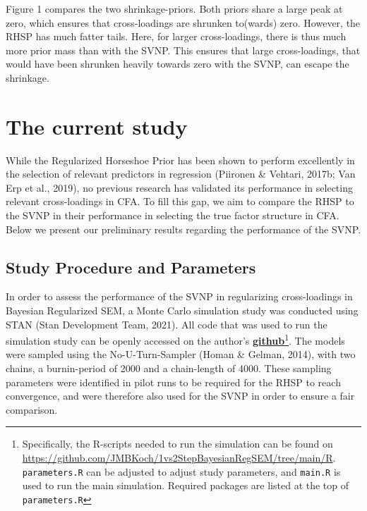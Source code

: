 \documentclass[
  man,floatsintext]{apa6}
\begin{document}
Figure 1 compares the two shrinkage-priors. Both priors share a large peak at zero, which ensures that cross-loadings are shrunken to(wards) zero. However, the RHSP has much fatter tails. Here, for larger cross-loadings, there is thus much more prior mass than with the SVNP. This ensures that large cross-loadings, that would have been shrunken heavily towards zero with the SVNP, can escape the shrinkage.

\hypertarget{the-current-study}{%
\section{The current study}\label{the-current-study}}

While the Regularized Horseshoe Prior has been shown to perform excellently in the selection of relevant predictors in regression (Piironen \& Vehtari, 2017b; Van Erp et al., 2019), no previous research has validated its performance in selecting relevant cross-loadings in CFA. To fill this gap, we aim to compare the RHSP to the SVNP in their performance in selecting the true factor structure in CFA. Below we present our preliminary results regarding the performance of the SVNP.

\hypertarget{study-procedure-and-parameters}{%
\subsection{Study Procedure and Parameters}\label{study-procedure-and-parameters}}

In order to assess the performance of the SVNP in regularizing cross-loadings in Bayesian Regularized SEM, a Monte Carlo simulation study was conducted using STAN (Stan Development Team, 2021). All code that was used to run the simulation study can be openly accessed on the author's \href{https://github.com/JMBKoch/1vs2StepBayesianRegSEM}{\textbf{github}}\footnote{Specifically, the R-scripts needed to run the simulation can be found on \url{https://github.com/JMBKoch/1vs2StepBayesianRegSEM/tree/main/R}. \texttt{parameters.R} can be adjusted to adjust study parameters, and \texttt{main.R} is used to run the main simulation. Required packages are listed at the top of \texttt{parameters.R}}. The models were sampled using the No-U-Turn-Sampler (Homan \& Gelman, 2014), with two chains, a burnin-period of 2000 and a chain-length of 4000. These sampling parameters were identified in pilot runs to be required for the RHSP to reach convergence, and were therefore also used for the SVNP in order to ensure a fair comparison.
\end{document}

